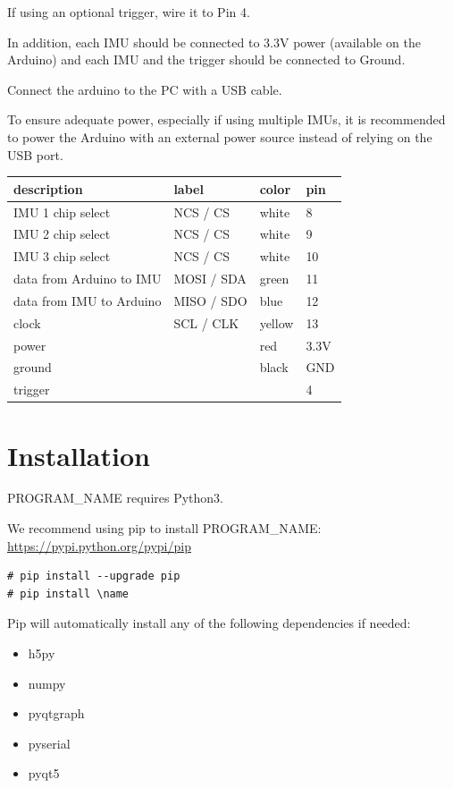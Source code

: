 \documentclass[11pt,letterpaper,article,oneside]{memoir}
\newcommand{\name}{PROGRAM\_NAME}
\begin{document}
If using an optional trigger, wire it to Pin 4.

In addition, each IMU should be connected to 3.3V power (available on the
Arduino) and each IMU and the trigger should be connected to Ground.

Connect the arduino to the PC with a USB cable.

To ensure adequate power, especially if using multiple IMUs, it is recommended
to power the Arduino with an external power source instead of relying on the USB
port.



\begin{table}
\centering
\begin{tabular}{@{}*4l@{}}
\toprule
description & label & color & pin \\
\midrule 
IMU 1 chip select & NCS / CS & white & 8 \\
IMU 2 chip select & NCS / CS & white & 9 \\
IMU 3 chip select & NCS / CS & white & 10 \\
data from Arduino to IMU & MOSI / SDA & green & 11 \\
data from IMU to Arduino & MISO / SDO & blue & 12 \\
clock & SCL / CLK & yellow & 13 \\
power &  & red & 3.3V \\
ground &  & black & GND \\
trigger &  &  & 4 \\
\bottomrule
\end{tabular}
\label{tab:wiring}
\end{table}




\section{Installation}

\name{} requires Python3.

We recommend using pip to install \name{}:
\url{https://pypi.python.org/pypi/pip}

\begin{verbatim}
# pip install --upgrade pip
# pip install \name
\end{verbatim}

Pip will automatically install any of the following dependencies if needed:
\begin{itemize}
\item h5py
\item numpy
\item pyqtgraph
\item pyserial
\item pyqt5
\end{itemize}
\end{document}
